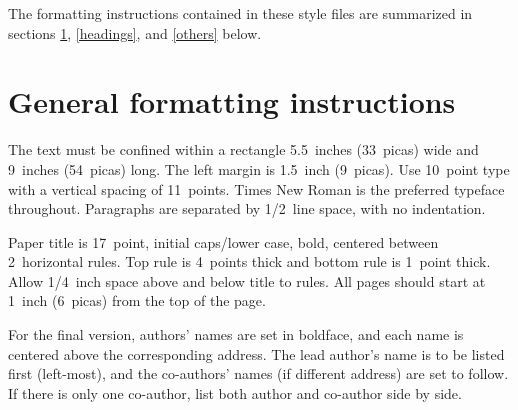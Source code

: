 \documentclass{article} %
\begin{document}
The formatting instructions contained in these style files are summarized in
sections \ref{gen_inst}, \ref{headings}, and \ref{others} below.




\section{General formatting instructions}
\label{gen_inst}

	The text must be confined within a rectangle 5.5~inches (33~picas) wide and
9~inches (54~picas) long. The left margin is 1.5~inch (9~picas).
Use 10~point type with a vertical spacing of 11~points. Times New Roman is the
preferred typeface throughout. Paragraphs are separated by 1/2~line space,
with no indentation.

Paper title is 17~point, initial caps/lower case, bold, centered between
2~horizontal rules. Top rule is 4~points thick and bottom rule is 1~point
thick. Allow 1/4~inch space above and below title to rules. All pages should
start at 1~inch (6~picas) from the top of the page.


For the final version, authors' names are
set in boldface, and each name is centered above the corresponding
address. The lead author's name is to be listed first (left-most), and
the co-authors' names (if different address) are set to follow. If
there is only one co-author, list both author and co-author side by side.
\end{document}
